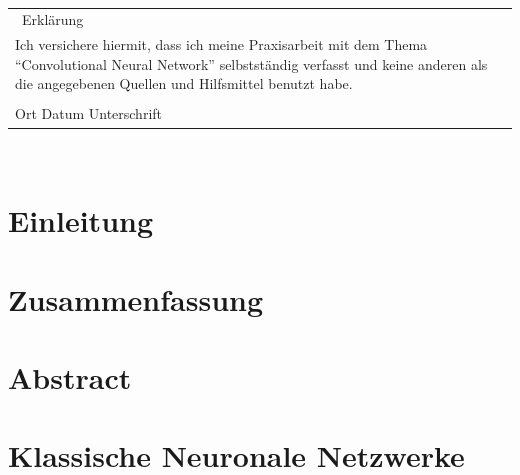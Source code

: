 \documentclass[12pt,oneside, 
liststotoc, 						%
bibtotoc,						%
titlepage, 						%
abstracton,					%
DIV11,						%
BCOR6mm,					%
]{scrreprt}
\newcommand{\titel}{Convolutional Neural Network}
\begin{document}

\clearpage

~\vfill
\begin{tabular}{|p{\linewidth}|}
\hline
~\hfill Erklärung \hfill~ \\[12pt]
Ich versichere hiermit, dass ich meine Praxisarbeit mit dem Thema ``\titel'' selbstständig verfasst und keine anderen als die angegebenen Quellen und Hilfsmittel benutzt habe.\\
\vspace{1cm}
\underline{\hspace{5cm}}\hspace{2cm}\underline{\hspace{5cm}}\\[6pt]
Ort \hspace{1cm} Datum \hspace{4cm} Unterschrift\\
\hline
\end{tabular}
\vfill ~
\clearpage
\rmfamily



\tableofcontents

\listoffigures
\listoftables

\printnomenclature


\chapter{Einleitung}
\clearpage

\chapter{Zusammenfassung}
\clearpage

\chapter{Abstract}
\clearpage

\chapter{Klassische Neuronale Netzwerke}
\clearpage
\end{document}
